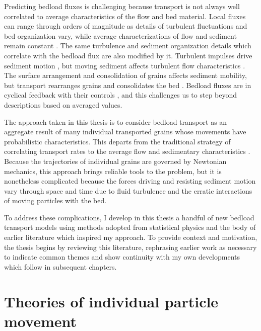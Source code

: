 Predicting bedload fluxes is challenging because transport is not always well correlated to average characteristics of the flow and bed material. 
Local fluxes can range through orders of magnitude as details of turbulent fluctuations and bed organization vary, while average characterizations of flow and sediment remain constant \citep{Sumer2003, Charru2004, Hassan2008, Venditti2017}.
The same turbulence and sediment organization details which correlate with the bedload flux are also modified by it.
Turbulent impulses drive sediment motion \citep{Valyrakis2010, Celik2014, Amir2014, Shih2017}, but moving sediment affects turbulent flow characteristics \citep{Singh2010, Santos2014, Liu2016}. The surface arrangement and consolidation of grains \citep{Miller1966,Paintal1971,Dwivedi2012} affects sediment mobility, but transport rearranges grains and consolidates the bed \citep{Kirchener1990, Charru2004, Allen2018}.
Bedload fluxes are in cyclical feedback with their controls \citep{Jerolmack2005}, and this challenges us to step beyond descriptions based on averaged values.

The approach taken in this thesis is to consider bedload transport as an aggregate result of many individual transported grains whose movements have probabilistic characteristics.
This departs from the traditional strategy of correlating transport rates to the average flow and sedimentary characteristics \citep{MeyerPeter1948, Parker1990, Wilcock2001}.
Because the trajectories of individual grains are governed by Newtonian mechanics, this approach brings reliable tools to the problem, but it is nonetheless complicated because the forces driving and resisting sediment motion vary through space and time due to fluid turbulence and the erratic interactions of moving particles with the bed.


To address these complications, I develop in this thesis a handful of new bedload transport models using methods adopted from statistical physics and the body of earlier literature which inspired my approach.
To provide context and motivation, the thesis begins by reviewing this literature, rephrasing earlier work as necessary to indicate common themes and show continuity with my own developments which follow in subsequent chapters.



\section{Theories of individual particle movement}



